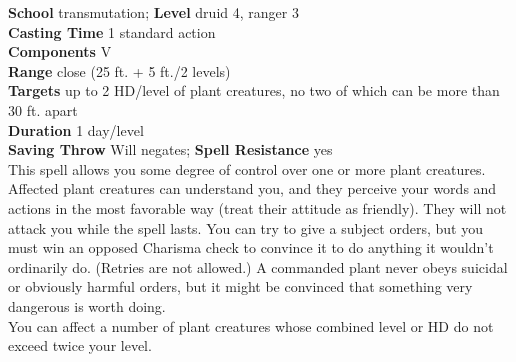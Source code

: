 \textbf{School} transmutation; \textbf{Level} druid 4, ranger 3\\
\textbf{Casting Time }1 standard action\\
\textbf{Components} V\\
\textbf{Range }close (25 ft. + 5 ft./2 levels)\\
\textbf{Targets} up to 2 HD/level of plant creatures, no two of which can be more than 30 ft. apart\\
\textbf{Duration} 1 day/level\\
\textbf{Saving Throw} Will negates; \textbf{Spell Resistance} yes\\
This spell allows you some degree of control over one or more plant creatures. Affected plant creatures can understand you, and they perceive your words and actions in the most favorable way (treat their attitude as friendly). They will not attack you while the spell lasts. You can try to give a subject orders, but you must win an opposed Charisma check to convince it to do anything it wouldn't ordinarily do. (Retries are not allowed.) A commanded plant never obeys suicidal or obviously harmful orders, but it might be convinced that something very dangerous is worth doing.\\
You can affect a number of plant creatures whose combined level or HD do not exceed twice your level.\\
